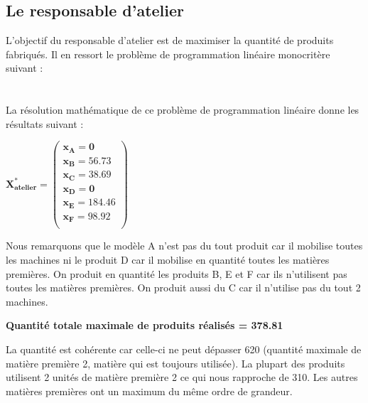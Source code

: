 \documentclass[12pt]{article}
\begin{document}
\subsection{Le responsable d'atelier}
L'objectif du responsable d'atelier est de maximiser la quantité de produits fabriqués. 
Il en ressort le problème de programmation linéaire monocritère suivant : \newline 
\\
\noindent{}
\\
\\

La résolution mathématique de ce problème de programmation linéaire donne les résultats suivant :\\



\begin{center}
$\mathbf{X^{*}_{atelier} = 
   \left (
   \begin{array}{c}
      x_{A} = 0 \\
      x_{B} = 56.73 \\
      x_{C} = 38.69 \\
      x_{D} = 0 \\
      x_{E} = 184.46 \\
      x_{F} = 98.92 \\
   \end{array}
   \right )
 } $ 
\end{center}
Nous remarquons que le modèle A n'est pas du tout produit car il mobilise toutes les machines ni le produit D car il mobilise en quantité toutes les matières premières. On produit en quantité les produits B, E et F car ils n’utilisent pas toutes les matières premières. On produit aussi du C car il n’utilise pas du tout 2 machines.
\\
\begin{center}
\textbf{Quantité totale maximale de produits réalisés = 378.81}
\end{center}
La quantité est cohérente car celle-ci ne peut dépasser 620 (quantité maximale de matière
première 2, matière qui est toujours utilisée). La plupart des produits utilisent 2 unités de 
matière première 2 ce qui nous rapproche de 310. Les autres matières premières ont un maximum du même ordre de grandeur.
\end{document}
